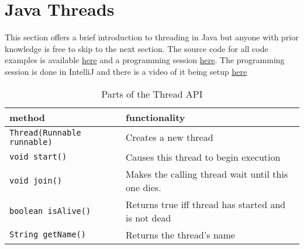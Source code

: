 \graphicspath{{./lab02/Images/}}


\maketocpage

\section{Java Threads}
This section offers a brief introduction to threading in Java but anyone with prior knowledge is free to skip to the next section. The source code for all code examples is available \href{https://github.com/JonSteinn/AndroidDevelopment/tree/master/examples/lab2/javathreads}{here} and a programming session \href{https://www.youtube.com/watch?v=JqSdEsKneJc}{here}. The programming session is done in IntelliJ and there is a video of it being setup \href{https://youtu.be/JpKJMFytYTE}{here}

\begin{table}[H]
\center
\begin{tabular}{l|l}
method & functionality \\
\hline
\texttt{Thread(Runnable runnable)} & Creates a new thread \\
\texttt{void start()} & Causes this thread to begin execution \\
\texttt{void join()} & Makes the calling thread wait until this one dies. \\
\texttt{boolean isAlive()} & Returns true iff thread has started and is not dead \\
\texttt{String getName()} & Returns the thread's name
\end{tabular}
\caption{Parts of the Thread API}
\label{table:tapi}
\end{table}

